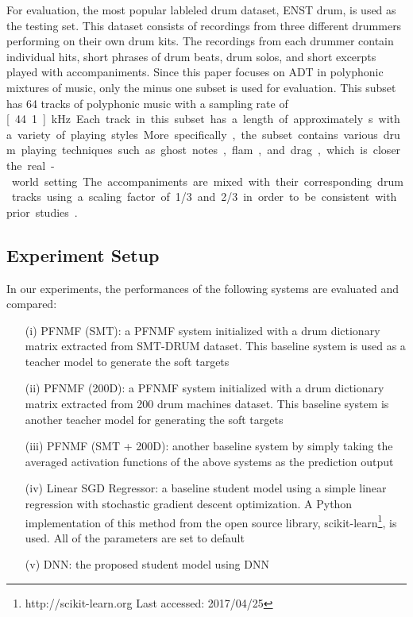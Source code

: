 \documentclass{article}
\begin{document}
For evaluation, the most popular lableled drum dataset, ENST drum\cite{Gillet2006}, is used as the testing set. This dataset consists of recordings from three different drummers performing on their own drum kits. The recordings from each drummer contain individual hits, short phrases of drum beats, drum solos, and short excerpts played with accompaniments. Since this paper focuses on ADT in polyphonic mixtures of music, only the minus one subset is used for evaluation. This subset has 64 tracks of polyphonic music with a sampling rate of \unit[44.1]{kHz}. Each track in this subset has a length of approximately \unit[70]{s} with a variety of playing styles. More specifically, the subset contains various drum playing techniques such as ghost notes, flam, and drag, which is closer the real-world setting. The accompaniments are mixed with their corresponding drum tracks using a scaling factor of 1/3 and 2/3 in order to be consistent with prior studies \cite{Paulus2009a, Wu2015a, Southall2016}.

\subsection{Experiment Setup}
In our experiments, the performances of the following systems are evaluated and compared: 
\begin{itemize}
\item[(i)] PFNMF (SMT): a PFNMF system initialized with a drum dictionary matrix extracted from SMT-DRUM dataset. This baseline system is used as a teacher model to generate the soft targets
\item[(ii)] PFNMF (200D): a PFNMF system initialized with a drum dictionary matrix extracted from 200 drum machines dataset. This baseline system is another teacher model for generating the soft targets
\item[(iii)] PFNMF (SMT + 200D): another baseline system by simply taking the averaged activation functions of the above systems as the prediction output
\item[(iv)] Linear SGD Regressor: a baseline student model using a simple linear regression with stochastic gradient descent optimization. A Python implementation of this method from the open source library, scikit-learn\footnote{http://scikit-learn.org Last accessed: 2017/04/25}, is used. All of the parameters are set to default
\item[(v)] DNN: the proposed student model using DNN
\end{itemize}
\end{document}
